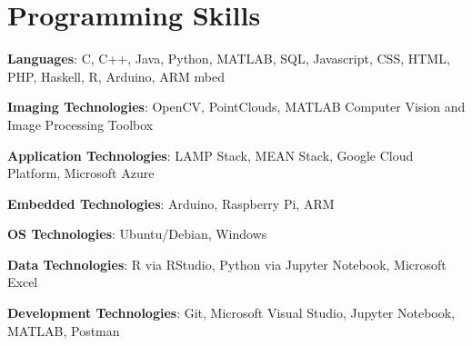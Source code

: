 \documentclass[letterpaper,11pt]{article}
\newcommand{\resumeSubHeadingListStart}{\begin{itemize}[leftmargin=*]}
\newcommand{\resumeSubHeadingListEnd}{\end{itemize}}
\begin{document}

\section{Programming Skills}
  \resumeSubHeadingListStart
    \item{
      \textbf{Languages}{: C, C++,  Java, Python, MATLAB, SQL, Javascript, CSS, HTML, PHP, Haskell, R, Arduino, ARM mbed}
     \item
      \textbf{Imaging Technologies}{: OpenCV, PointClouds, MATLAB Computer Vision and Image Processing Toolbox}
     \item
      \textbf{Application Technologies}{: LAMP Stack, MEAN Stack, Google Cloud Platform, Microsoft Azure}
     \item
      \textbf{Embedded Technologies}{: Arduino, Raspberry Pi, ARM}
     \item
      \textbf{OS Technologies}{: Ubuntu/Debian, Windows}
     \item
      \textbf{Data Technologies}{: R via RStudio, Python via Jupyter Notebook, Microsoft Excel}
     \item
      \textbf{Development Technologies}{: Git, Microsoft Visual Studio, Jupyter Notebook, MATLAB, Postman}
    }
  \resumeSubHeadingListEnd


\end{document}
